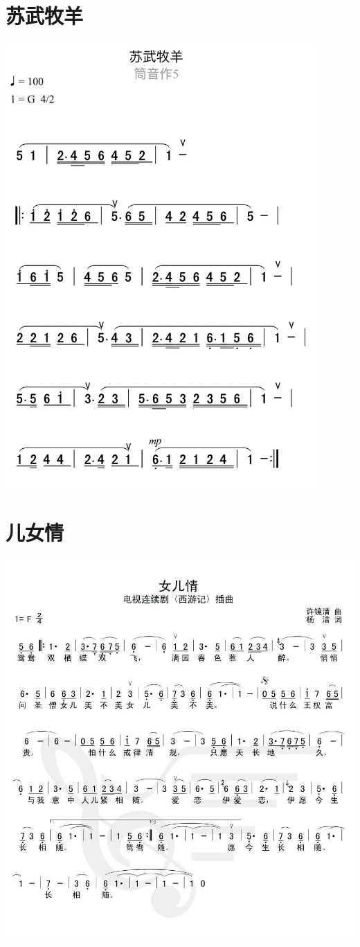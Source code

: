 \documentclass[cn,pad,chinese,chinesefont=nofont]{elegantbook}
\begin{document}
\section{苏武牧羊}
	\includegraphics[width=0.9\textwidth]{dongxiao/IMG_0862-苏武牧羊.png}
\section{儿女情}          
	\includegraphics[width=\textwidth]{dongxiao/西游记-儿女情}  
\end{document}
